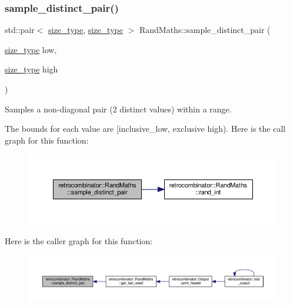 \subsubsection{\texorpdfstring{sample\+\_\+distinct\+\_\+pair()}{sample\_distinct\_pair()}}
{\footnotesize\ttfamily std\+::pair$<$ \hyperlink{constants_8h_a8e1541b50cee66a791df4c437ccbb385}{size\+\_\+type}, \hyperlink{constants_8h_a8e1541b50cee66a791df4c437ccbb385}{size\+\_\+type} $>$ Rand\+Maths\+::sample\+\_\+distinct\+\_\+pair (\begin{DoxyParamCaption}\item[{\hyperlink{constants_8h_a8e1541b50cee66a791df4c437ccbb385}{size\+\_\+type}}]{low,  }\item[{\hyperlink{constants_8h_a8e1541b50cee66a791df4c437ccbb385}{size\+\_\+type}}]{high }\end{DoxyParamCaption})}



Samples a non-\/diagonal pair (2 distinct values) within a range. 

The bounds for each value are \mbox{[}inclusive\+\_\+low, exclusive high). Here is the call graph for this function\+:
\nopagebreak
\begin{figure}[H]
\begin{center}
\leavevmode
\includegraphics[width=350pt]{classretrocombinator_1_1RandMaths_a2758ba7c9818bc664c4b751a697e1fe6_cgraph}
\end{center}
\end{figure}
Here is the caller graph for this function\+:
\nopagebreak
\begin{figure}[H]
\begin{center}
\leavevmode
\includegraphics[width=350pt]{classretrocombinator_1_1RandMaths_a2758ba7c9818bc664c4b751a697e1fe6_icgraph}
\end{center}
\end{figure}
\mbox{\label{classretrocombinator_1_1RandMaths_a6a7fe159f46afec51d997e4d07d2cfe6}} 
